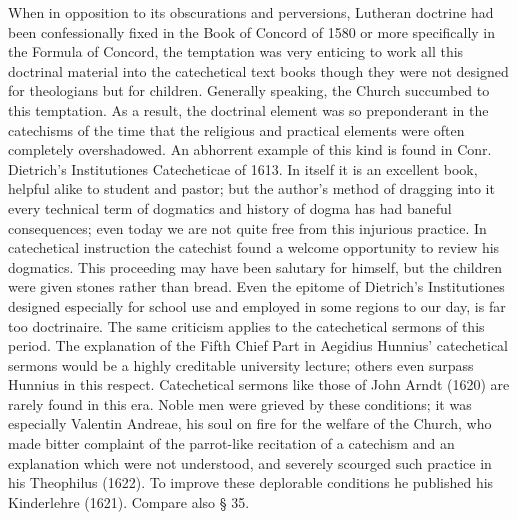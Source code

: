 When in opposition to its obscurations and perversions, Lutheran doctrine had been confessionally fixed in the Book of Concord of 1580 or more specifically in the Formula of Concord, the temptation was very enticing to work all this doctrinal material into the catechetical text books though they were not designed for theologians but for children. Generally speaking, the Church succumbed to this temptation. As a result, the doctrinal element was so preponderant in the catechisms of the time that the religious and practical elements were often completely overshadowed. An abhorrent example of this kind is found in Conr. Dietrich’s Institutiones Catecheticae of 1613. In itself it is an excellent book, helpful alike to student and pastor; but the author’s method of dragging into it every technical term of dogmatics and history of dogma has had baneful consequences; even today we are not quite free from this injurious practice. In catechetical instruction the catechist found a welcome opportunity to review his dogmatics. This proceeding may have been salutary for himself, but the children were given stones rather than bread. Even the epitome of Dietrich’s Institutiones designed especially for school use and employed in some regions to our day, is far too doctrinaire. The same criticism applies to the catechetical sermons of this period. The explanation of the Fifth Chief Part in Aegidius Hunnius’ catechetical sermons would be a highly creditable university lecture; others even surpass Hunnius in this respect. Catechetical sermons like those of John Arndt (1620) are rarely found in this era. Noble men were grieved by these conditions; it was especially Valentin Andreae, his soul on fire for the welfare of the Church, who made bitter complaint of the parrot-like recitation of a catechism and an explanation
which were not understood, and severely scourged such practice in his Theophilus (1622). To improve these deplorable conditions he published his Kinderlehre (1621). Compare also § 35.

